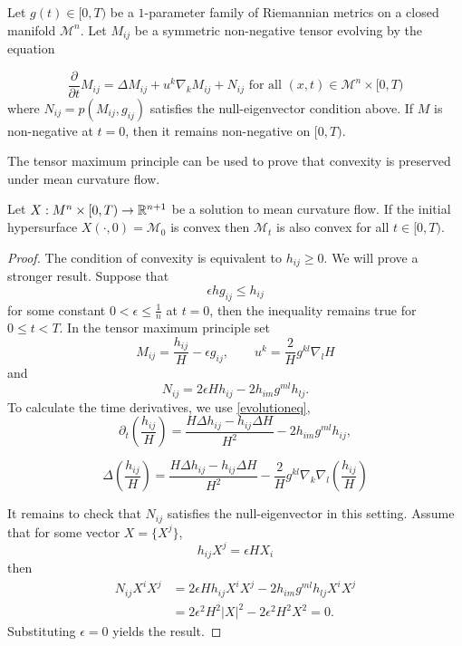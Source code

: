 \begin{lemma}
	Let $ g(t) \in [0,T)  $ be a $ 1 $-parameter family of Riemannian metrics on a closed manifold $ \mathcal{M}^{n} $. Let $ M_{ij} $ be a symmetric non-negative tensor evolving by the equation 
	
        \[ \frac{ \partial}{ \partial t}M_{ij} = \Delta M_{ij} + u^{k}\nabla_{k}M_{ij}+ N_{ij}  \text{ for all } (x,t) \in  \mathcal{M}^{n} \times [0,T) \]
	where $ N_{ij} = p(M_{ij},g_{ij}) $ satisfies the null-eigenvector condition above. If $ M $ is non-negative at $ t=0 $, then it remains non-negative on $ [0,T) $.
\end{lemma}

The tensor maximum principle can be used to prove that convexity is preserved under mean curvature flow. 

\begin{lemma}
    Let $ X: M^{n} \times [0, T) \to \mathbb{R}^{n+1} $ be a solution to mean curvature flow. If the initial hypersurface $ X(\cdot, 0) = \mathcal{M}_{0}$ is convex then $ \mathcal{M}_{t} $ is also convex for all $ t \in [0,T) $.
\end{lemma}
\begin{proof}
    The condition of convexity is equivalent to $ h_{ij} \ge 0 $. We will prove a stronger result. Suppose that 
    \[ \epsilon h g_{ij} \le h_{ij} \]
    for some constant $ 0 < \epsilon \le \frac{1}{n} $ at $ t = 0 $, then the inequality remains true for $ 0 \le t <T $. In the tensor maximum principle set 
    \[ M_{ij} = \frac{h_{ij}}{H} - \epsilon g_{ij}, \qquad u^{k} = \frac{2}{H}g^{kl} \nabla_{l}H \]
    and 
    \[ N_{ij} = 2 \epsilon H h_{ij} - 2h_{im}g^{ml}h_{lj}. \]
    To calculate the time derivatives, we use \cref{evolutioneq}, 
    \[ \partial_{t}\left( \frac{h_{ij}}{H} \right) = \frac{H \Delta h_{ij}- h_{ij}\Delta H}{H^{2}} - 2h_{im}g^{ml}h_{ij},  \]
    
    \[ \Delta \left( \frac{h_{ij}}{H} \right)  = \frac{H \Delta h_{ij}- h_{ij} \Delta H }{H^{2}} - \frac{2}{H}g^{kl}\nabla_{k
    }\nabla_{l}( \frac{h_{ij}}{H})\]


    It remains to check that $ N_{ij} $ satisfies the null-eigenvector in this setting. Assume that for some vector $ X = \{X^{j}\} $, 
    \[ h_{ij}  X^{j} = \epsilon HX_{i} \]
    then \begin{align*}
        N_{ij}X^{i}X^{j} & = 2 \epsilon H h_{ij}X^{i}X^{j} - 2h_{im}g^{ml}h_{lj}X^{i}X^{j} \\
        & = 2 \epsilon^{2}H^{2}|X|^{2} - 2 \epsilon^{2}H^{2}X^{2} = 0. 
    \end{align*}
    Substituting $ \epsilon = 0 $ yields the result. 
\end{proof}


